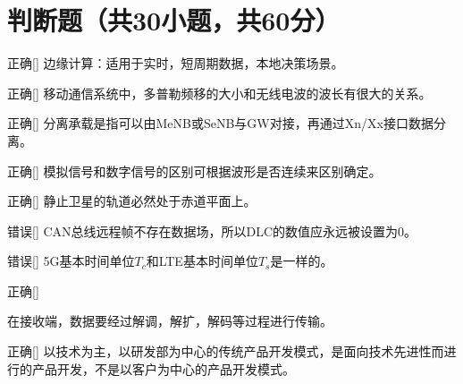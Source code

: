 \section{判断题（共30小题，共60分）}

\begin{choice}{\;正确\;}[]
    边缘计算：适用于实时，短周期数据，本地决策场景。
\end{choice}



\begin{choice}{\;正确\;}[]
    移动通信系统中，多普勒频移的大小和无线电波的波长有很大的关系。
\end{choice}

\begin{choice}{\;正确\;}[]
    分离承载是指可以由MeNB或SeNB与GW对接，再通过Xn/Xx接口数据分离。
\end{choice}

\begin{choice}{\;正确\;}[]
    模拟信号和数字信号的区别可根据波形是否连续来区别确定。
\end{choice}

\begin{choice}{\;正确\;}[]
    静止卫星的轨道必然处于赤道平面上。

\end{choice}


\begin{choice}{\;错误\;}[]
    CAN总线远程帧不存在数据场，所以DLC的数值应永远被设置为0。

\end{choice}

\begin{choice}{\;错误\;}[]
    5G基本时间单位$T_c$和LTE基本时间单位$T_s$是一样的。

\end{choice}

\begin{choice}{\;正确\;}[]

    在接收端，数据要经过解调，解扩，解码等过程进行传输。
\end{choice}


\begin{choice}{\;正确\;}[]
    以技术为主，以研发部为中心的传统产品开发模式，是面向技术先进性而进行的产品开发，不是以客户为中心的产品开发模式。

\end{choice}

